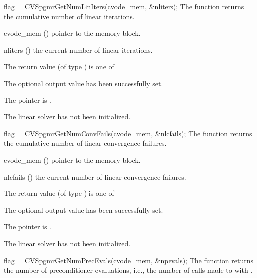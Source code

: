 {
  flag = CVSpgmrGetNumLinIters(cvode\_mem, \&nliters);
}
{
  The function  returns the
  cumulative number of linear iterations.
}
{
  \begin{args}
  \item[cvode\_mem] ()
    pointer to the {\cvode} memory block.
  \item[nliters] ()
    the current number of linear iterations.
  \end{args}
}
{
  The return value  (of type ) is one of
  \begin{args}
  \item[\Id{CVSPGMR\_SUCCESS}] 
    The optional output value has been successfully set.
  \item[\Id{CVSPGMR\_MEM\_NULL}]
    The  pointer is .
  \item[\Id{CVSPGMR\_LMEM\_NULL}]
    The {\cvspgmr} linear solver has not been initialized.
  \end{args}
}
{}
{
  flag = CVSpgmrGetNumConvFails(cvode\_mem, \&nlcfails);
}
{
  The function  returns the
  cumulative number of linear convergence failures.
}
{
  \begin{args}
  \item[cvode\_mem] ()
    pointer to the {\cvode} memory block.
  \item[nlcfails] ()
    the current number of linear convergence failures.
  \end{args}
}
{
  The return value  (of type ) is one of
  \begin{args}
  \item[\Id{CVSPGMR\_SUCCESS}] 
    The optional output value has been successfully set.
  \item[\Id{CVSPGMR\_MEM\_NULL}]
    The  pointer is .
  \item[\Id{CVSPGMR\_LMEM\_NULL}]
    The {\cvspgmr} linear solver has not been initialized.
  \end{args}
}
{}
{
  flag = CVSpgmrGetNumPrecEvals(cvode\_mem, \&npevals);
}
{
  The function  returns the
  number of preconditioner evaluations, i.e., the number of 
  calls made to  with .
}

